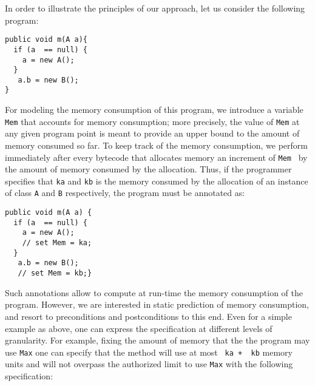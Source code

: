 



In order to illustrate the principles of our approach, let us consider
the following program:

\begin{lstlisting}[frame=trbl] 
public void m(A a){
  if (a  == null) {
    a = new A();
  }  
   a.b = new B();
}
\end{lstlisting}

For modeling the memory consumption of this program, we introduce
a \ghost{}  variable \lstinline!Mem! that accounts for memory consumption; more
precisely, the value of \lstinline!Mem! at any given program point is meant
to provide an upper bound to the amount of memory consumed so far. To
keep track of the memory consumption, we perform immediately after every 
bytecode that allocates memory an increment of \lstinline!Mem! \ by the amount
of memory consumed by the allocation. Thus, if the programmer specifies
that \lstinline!ka! and \lstinline!kb! is the memory consumed by the allocation of 
an instance of class \lstinline!A! and  \lstinline!B! respectively, the program must
be annotated as:
\begin{lstlisting}[frame=trbl] 
public void m(A a) {
  if (a  == null) {
    a = new A();
    // set Mem = ka;
  }  
   a.b = new B();
   // set Mem = kb;}
\end{lstlisting}

Such annotations allow to compute at run-time the memory consumption of 
the program. However, we are interested in static prediction of memory
consumption, and resort to preconditions and postconditions to this end.
Even for a simple example as above, one can express the specification
at different levels of granularity. For example, fixing the amount of memory that
the the program may use \lstinline!Max! one can specify that the method will use at most 
\lstinline! ka +  kb! memory units and will not overpass the authorized limit to use \lstinline!Max! with the following specification:

